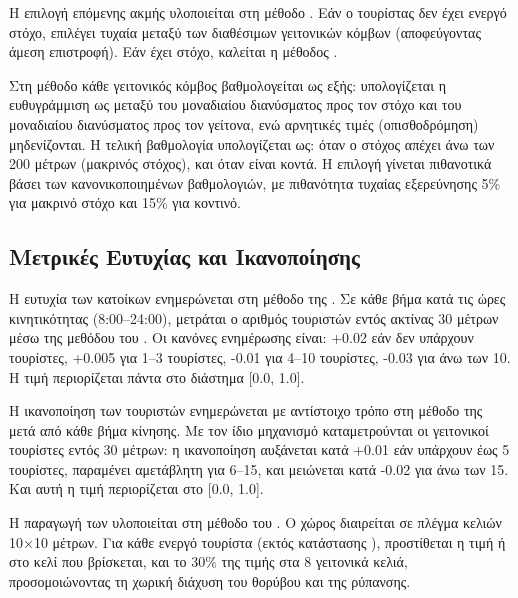 Η επιλογή επόμενης ακμής υλοποιείται στη μέθοδο
. Εάν ο τουρίστας δεν έχει ενεργό
στόχο, επιλέγει τυχαία μεταξύ των διαθέσιμων γειτονικών κόμβων
(αποφεύγοντας άμεση επιστροφή). Εάν έχει στόχο, καλείται η
μέθοδος .

Στη μέθοδο  κάθε γειτονικός
κόμβος βαθμολογείται ως εξής: υπολογίζεται η ευθυγράμμιση
 ως  μεταξύ του μοναδιαίου
διανύσματος προς τον στόχο και του μοναδιαίου διανύσματος προς τον
γείτονα, ενώ αρνητικές τιμές (οπισθοδρόμηση) μηδενίζονται.
Η τελική βαθμολογία υπολογίζεται ως:  όταν ο στόχος απέχει άνω των
200 μέτρων (μακρινός στόχος), και  όταν είναι κοντά. Η επιλογή γίνεται πιθανοτικά
βάσει των κανονικοποιημένων βαθμολογιών, με πιθανότητα τυχαίας
εξερεύνησης 5\% για μακρινό στόχο και 15\% για κοντινό.

\subsection{Μετρικές Ευτυχίας και Ικανοποίησης}

Η ευτυχία των κατοίκων ενημερώνεται στη μέθοδο
 της . Σε κάθε βήμα
κατά τις ώρες κινητικότητας (8:00–24:00), μετράται ο αριθμός τουριστών
εντός ακτίνας 30 μέτρων μέσω της μεθόδου  του
. Οι κανόνες ενημέρωσης είναι: +0.02 εάν δεν
υπάρχουν τουρίστες, +0.005 για 1–3 τουρίστες, -0.01 για 4–10
τουρίστες, -0.03 για άνω των 10. Η τιμή περιορίζεται πάντα στο
διάστημα [0.0, 1.0].

Η ικανοποίηση των τουριστών ενημερώνεται με αντίστοιχο τρόπο στη
μέθοδο  της  μετά από
κάθε βήμα κίνησης. Με τον ίδιο μηχανισμό 
καταμετρούνται οι γειτονικοί τουρίστες εντός 30 μέτρων: η ικανοποίηση
αυξάνεται κατά +0.01 εάν υπάρχουν έως 5 τουρίστες, παραμένει
αμετάβλητη για 6–15, και μειώνεται κατά -0.02 για άνω των 15.
Και αυτή η τιμή περιορίζεται στο [0.0, 1.0].

Η παραγωγή των  υλοποιείται στη μέθοδο
 του . Ο χώρος διαιρείται σε
πλέγμα κελιών 10×10 μέτρων. Για κάθε ενεργό τουρίστα (εκτός κατάστασης
), προστίθεται η τιμή  ή  στο
κελί που βρίσκεται, και το 30\% της τιμής στα 8 γειτονικά κελιά,
προσομοιώνοντας τη χωρική διάχυση του θορύβου και της ρύπανσης.

